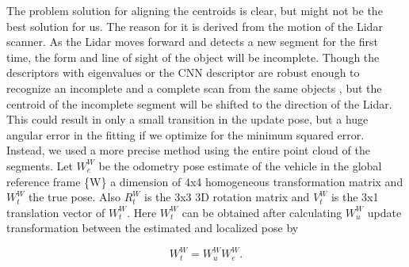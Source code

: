 \documentclass[letterpaper, 10 pt, conference]{ieeeconf}  %
\begin{document}
The problem solution for aligning the centroids is clear, but might not be the best solution for us. The reason for it is derived from the motion of the Lidar scanner. As the Lidar moves forward and detects a new segment for the first time, the form and line of sight of the object will be incomplete. Though the descriptors with eigenvalues or the CNN descriptor are robust enough to recognize an incomplete and a complete scan from the same objects \cite{segmap}, but the centroid of the incomplete segment will be shifted to the direction of the Lidar. This could result in only a small transition in the update pose, but a huge angular error in the fitting if we optimize for the minimum squared error. Instead, we used a more precise method using the entire point cloud of the segments. Let $W_e^W$ be the odometry pose estimate of the vehicle in the global reference frame \{W\} a dimension of 4x4 homogeneous transformation matrix and $W_t^W$ the true pose. Also $R_t^W$ is the 3x3 3D rotation matrix and $V_t^W$ is the 3x1 translation vector of $W_t^W$. Here $W_t^W$ can be obtained after calculating $W_u^W$ update transformation between the estimated and localized pose by

\begin{equation}
    W_t^W=W_u^W  W_e^W.
\end{equation}
\end{document}
